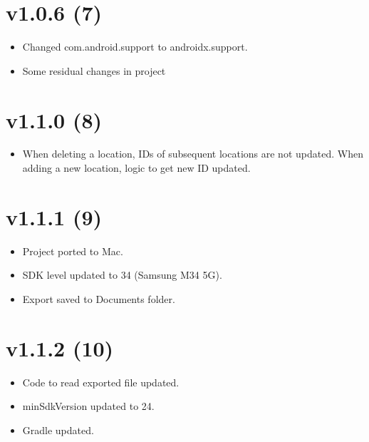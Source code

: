\documentclass{article}
\begin{document}
    \section{v1.0.6 (7)}\label{sec:7}
    \begin{itemize}
        \item Changed com.android.support to androidx.support.
        \item Some residual changes in project
    \end{itemize}


    \section{v1.1.0 (8)}\label{sec:8}
    \begin{itemize}
        \item When deleting a location, IDs of subsequent locations are not updated.
        When adding a new location, logic to get new ID updated.
    \end{itemize}

    \section{v1.1.1 (9)}\label{sec:9}
    \begin{itemize}
        \item Project ported to Mac.
        \item SDK level updated to 34 (Samsung M34 5G).
        \item Export saved to Documents folder.
    \end{itemize}

    \section{v1.1.2 (10)}\label{sec:10}
    \begin{itemize}
        \item Code to read exported file updated.
        \item minSdkVersion updated to 24.
        \item Gradle updated.
    \end{itemize}
\end{document}
